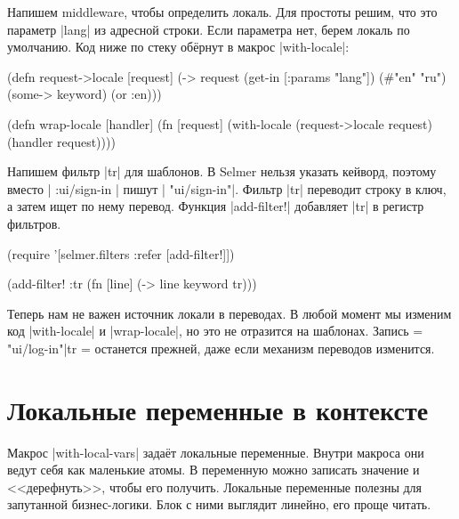 
Напишем middleware, чтобы определить локаль. Для простоты решим, что это
параметр \spverb|lang| из адресной строки. Если параметра нет, берем локаль по
умолчанию. Код ниже по стеку обёрнут в макрос \spverb|with-locale|:

\begin{english}
  \begin{clojure}
(defn request->locale [request]
  (-> request
      (get-in [:params "lang"])
      (#{"en" "ru"})
      (some-> keyword)
      (or :en)))

(defn wrap-locale [handler]
  (fn [request]
    (with-locale (request->locale request)
      (handler request))))
  \end{clojure}
\end{english}

Напишем фильтр \spverb|tr| для шаблонов. В Selmer нельзя указать кейворд,
поэтому вместо \spverb|{{ :ui/sign-in }}| пишут \spverb|{{ "ui/sign-in"}}|.
Фильтр \spverb|tr| переводит строку в ключ, а затем ищет по нему
перевод. Функция \spverb|add-filter!| добавляет \spverb|tr| в регистр фильтров.

\begin{english}
  \begin{clojure}
(require '[selmer.filters :refer [add-filter!]])

(add-filter! :tr
 (fn [line]
   (-> line keyword tr)))
  \end{clojure}
\end{english}

Теперь нам не важен источник локали в переводах. В любой момент мы изменим код
\spverb|with-locale| и \spverb|wrap-locale|, но это не отразится на
шаблонах. Запись \spverb={{ "ui/log-in"|tr }}= останется прежней, даже если
механизм переводов изменится.

\section{Локальные переменные в контексте}


Макрос \spverb|with-local-vars| зада\"{е}т локальные переменные. Внутри макроса они
ведут себя как маленькие атомы. В переменную можно записать значение и
<<дерефнуть>>, чтобы его получить. Локальные переменные полезны для запутанной
бизнес-логики. Блок с ними выглядит линейно, его проще читать.

